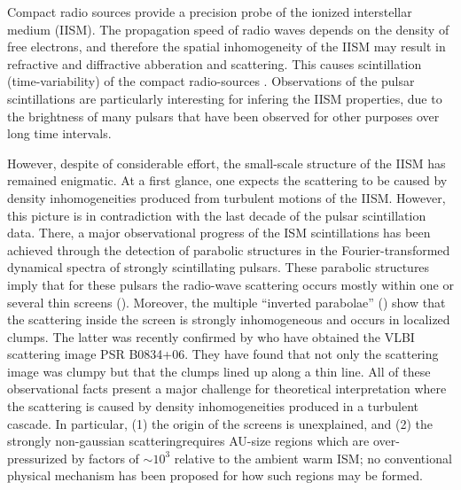 \documentclass[useAMS,usenatbib]{mn2e}
\begin{document}
Compact radio sources provide a precision probe of the ionized interstellar medium
(IISM).  The propagation speed of radio waves depends on the density
of free electrons, and therefore the spatial inhomogeneity of the IISM may result in refractive and diffractive
abberation and scattering. This causes scintillation (time-variability) of the compact radio-sources
 \citep{1968Natur.218..920S,1986ApJ...301L..53B,2006ApJS..165..439R} . 
Observations of the pulsar scintillations are particularly interesting for infering the IISM properties, 
due to the brightness of many pulsars that have been observed for other purposes over long time intervals.

However, despite of considerable effort, the small-scale structure of the IISM
has remained enigmatic. At a first glance, one expects the scattering to be caused by density
inhomogeneities produced from turbulent motions of the IISM. However, this picture
is in contradiction with the last decade of the pulsar scintillation data.   There, a
major observational progress of the ISM scintillations has been
achieved through the \citet{2001ApJ...549L..97S}
detection of parabolic structures in the Fourier-transformed dynamical
spectra of strongly scintillating pulsars. These parabolic structures
imply that for these pulsars the radio-wave scattering occurs mostly
within one or several thin screens
(\cite{2004MNRAS.354...43W,2006ApJ...637..346C,2008MNRAS.388.1214W}).
Moreover, the multiple ``inverted
parabolae'' (\cite{2005ApJ...619L.171H}) show that the scattering
inside the screen is strongly inhomogeneous and occurs in
localized clumps. The latter was recently confirmed by \cite{2010ApJ...708..232B} who have obtained the VLBI scattering
image PSR B0834+06. They
have found that not only the scattering image was clumpy but that the
clumps lined up along a thin line.
All of these
observational facts present a major challenge for theoretical
interpretation where the scattering is caused by density inhomogeneities produced in a turbulent
cascade. In particular, (1) the origin of the screens is unexplained,
and (2) the strongly non-gaussian scatteringrequires AU-size
regions which are over-pressurized by factors of $\sim 10^3$
relative to the ambient warm ISM\citep{1987Natur.328..324R}; no conventional
physical mechanism has been proposed for how such regions may be
formed.
\end{document}
